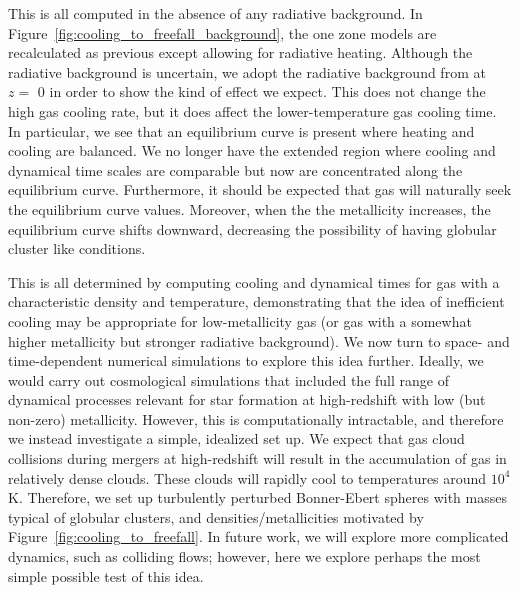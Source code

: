 \documentclass[useAMS,usenatbib]{mn2e}
\begin{document}
This is all computed in the absence of any radiative background.  In Figure~\ref{fig:cooling_to_freefall_background}, 
the one zone models are recalculated as previous except allowing for radiative heating.   Although the radiative background
is uncertain, we adopt the radiative background from \citet{Haardt2012} at $z=$ 0 
in order to show the kind of effect we expect.  This does not change the high gas cooling rate, but it does affect the lower-temperature gas cooling time.   In particular, we see that an equilibrium curve is present where
heating and cooling are balanced. We no longer have the extended region where cooling and dynamical time scales are 
comparable but now are concentrated along the equilibrium curve. Furthermore, it should be expected that gas will
naturally seek the equilibrium curve values.  Moreover, when the
the metallicity increases, the equilibrium curve shifts downward, decreasing the possibility of having globular cluster
like conditions.

This is all determined by computing cooling and dynamical times for gas with a characteristic density and temperature, demonstrating that the idea of inefficient cooling may be appropriate for low-metallicity gas (or gas with a somewhat higher metallicity but stronger radiative background).   We now turn to space- and time-dependent numerical simulations to explore this idea further.  Ideally, we would carry out cosmological simulations that included the full range of dynamical processes relevant for star formation at high-redshift with low (but non-zero) metallicity.  However, this is computationally intractable, and therefore we instead investigate a simple, idealized set up.  We expect that gas cloud collisions during mergers at high-redshift will result in the accumulation of gas in relatively dense clouds.  These clouds will rapidly cool to temperatures around $10^4$ K.  Therefore, we set up turbulently perturbed Bonner-Ebert spheres with masses typical of globular clusters, and densities/metallicities motivated by Figure~\ref{fig:cooling_to_freefall}.   In future work, we will explore more complicated dynamics, such as colliding flows; however, here we explore perhaps the most simple possible test of this idea.
\end{document}
